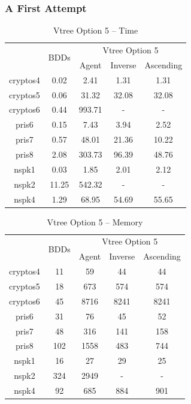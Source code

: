 \documentclass[11pt]{article}
\begin{document}
\subsubsection{A First Attempt}
\begin{table}
\centering
\begin{tabular}{|*{5}{c|}}
\hline
& \multirow{2}{*}{BDDs} & \multicolumn{3}{c|}{Vtree Option 5} \\ \cline{3-5}
& & Agent & Inverse & Ascending \\ \hline
cryptos4 & 0.02 & 2.41 & 1.31 & 1.31 \\ \hline
cryptos5 & 0.06 & 31.32 & 32.08 & 32.08 \\ \hline
cryptos6 & 0.44 & 993.71& - & - \\ \hline
pris6 & 0.15 & 7.43 & 3.94 & 2.52 \\ \hline
pris7 & 0.57 & 48.01 & 21.36 & 10.22 \\ \hline
pris8 & 2.08 & 303.73 & 96.39 & 48.76 \\ \hline
nspk1 & 0.03 & 1.85 & 2.01 & 2.12 \\ \hline
nspk2 & 11.25 & 542.32&- &- \\ \hline
nspk4 & 1.29 & 68.95 &54.69 & 55.65 \\ \hline
\end{tabular}
\label{table:vtree5time}
\caption{Vtree Option 5 -- Time}
\end{table}

\begin{table}
\centering
\begin{tabular}{|*{5}{c|}}
\hline
& \multirow{2}{*}{BDDs} & \multicolumn{3}{c|}{Vtree Option 5} \\ \cline{3-5}
& & Agent & Inverse & Ascending \\ \hline
cryptos4 & 11 & 59 & 44 & 44 \\ \hline
cryptos5 & 18 & 673 & 574 & 574 \\ \hline
cryptos6 & 45 & 8716 & 8241 & 8241 \\ \hline
pris6 & 31 & 76 & 45 & 52 \\ \hline
pris7 & 48 & 316 & 141 & 158 \\ \hline
pris8 & 102 & 1558 & 483 & 744\\ \hline
nspk1 & 16 & 27 & 29 & 25 \\ \hline
nspk2 & 324 & 2949 & - & - \\ \hline
nspk4 & 92 & 685 & 884 & 901\\ \hline
\end{tabular}
\label{table:vtree5memory}
\caption{Vtree Option 5 -- Memory}
\end{table}
\end{document}
